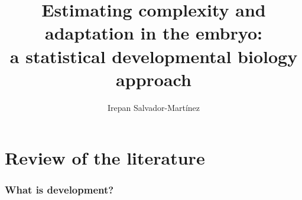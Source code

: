 \documentclass[officiallayout]{tktla_modified}
\title{\hfill\break \hfill\break   %
Estimating complexity and adaptation 
in the embryo:
\\ a statistical developmental biology approach
}
\author{Irepan Salvador-Mart\'inez}
\begin{document}
\frontmatter

\maketitle
\makenomenclature

\begin{acknowledgements}
  
\end{acknowledgements}

\renewcommand{\baselinestretch}{0.8}\normalsize
\tableofcontents
\renewcommand{\baselinestretch}{1.0}\normalsize

\mainmatter




\printnomenclature


	


\chapter{Review of the literature}




\subsection*{What is development?}
	
	
\end{document}
